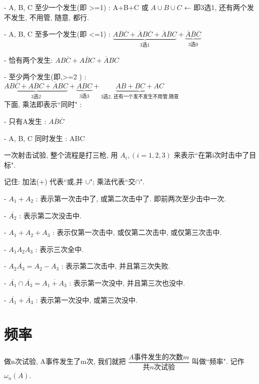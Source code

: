 \documentclass[UTF8]{ctexart}
\begin{document}
	- A, B, C 至少一个发生(即 >=1) : A+B+C 或 $A{\cup}B{\cup}C$ ← 即3选1, 还有两个发不发生, 不用管, 随意, 都行.
	
	- A, B, C 至多一个发生(即 <=1) : $\underset{3\text{选}1}{\underbrace{A\overline{B}\overline{C}+\overline{A}B\overline{C}+\overline{A}\overline{B}C}}+\underset{3\text{选}0}{\underbrace{\overline{A}\overline{B}\overline{C}}}		$
		
	- 恰有两个发生: $AB \overline{C} + A \overline{B} C + \overline{A} BC $
	
	- 至少两个发生(即,>=2 ) : $\underset{3\text{选}2}{\underbrace{AB\overline{C}+A\overline{B}C+\overline{A}BC}}+\underset{3\text{选}3}{\underbrace{ABC}}+\underset{3\text{选2,\ 还有一个发不发生不用管,随意}}{\underbrace{AB+BC+AC}}	$	\\
		
		

	下面, 乘法即表示``同时" :	
	
	- 只有A发生 : $A\overline{B}\overline{C}$	

	- A, B, C 同时发生 : ABC  \\
	
\begin{myEnvSample}
	一次射击试验, 整个流程是打三枪, 用 $A_i, (i=1,2,3)$ 来表示``在第i次时击中了目标".
	
	记住: 加法(+) 代表``或,并 $\cup$"; 乘法代表``交$\cap$".
	
	- $A_1+A_2$ : 表示第一次击中了, 或第二次击中了. 即前两次至少击中一次.
	
	- $	\overline{A_2}	$ : 表示第二次没击中.
	
	- $	A_1+A_2+A_3	$ : 表示仅第一次击中, 或仅第二次击中, 或仅第三次击中.
	
	- $	A_1A_2A_3	$ : 表示三次全中.
	
	- $	A_2\overline{A_3} = A_2 - A_3	$ : 表示第二次击中, 并且第三次失败.
	
	- $	\overline{A_1}\cap \overline{A_3}=\overline{A_1+A_3}$ : 表示第一次没中, 并且第三次也没中.
	
	- $	\overline{A_1}+\overline{A_3}	$ : 表示第一次没中, 或第三次没中.


\end{myEnvSample}



\section{频率}

做n次试验, A事件发生了m次, 我们就把 $\dfrac{A\text{事件发生的次数}m}{\text{共}n\text{次试验}}$ 叫做``频率". 记作$\omega _n\left( A \right) $.
\end{document}
